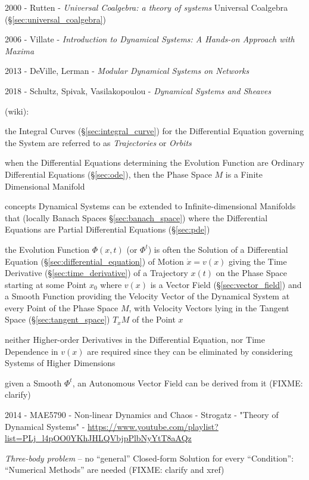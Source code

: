 2000 - Rutten - \emph{Universal Coalgebra: a theory of systems} \cite{rutten00}
\fist Universal Coalgebra (\S\ref{sec:universal_coalgebra})

2006 - Villate - \emph{Introduction to Dynamical Systems: A Hands-on Approach
  with Maxima}

2013 - DeVille, Lerman - \emph{Modular Dynamical Systems on Networks}

2018 - Schultz, Spivak, Vasilakopoulou - \emph{Dynamical Systems and Sheaves}

(wiki):

the Integral Curves (\S\ref{sec:integral_curve}) for the Differential Equation
governing the System are referred to as \emph{Trajectories} or \emph{Orbits}

when the Differential Equations determining the Evolution Function are Ordinary
Differential Equations (\S\ref{sec:ode}), then the Phase Space $M$ is a Finite
Dimensional Manifold

concepts Dynamical Systems can be extended to Infinite-dimensional Manifolds
that (locally Banach Spaces \S\ref{sec:banach_space}) where the Differential
Equations are Partial Differential Equations (\S\ref{sec:pde})

the Evolution Function $\Phi(x,t)$ (or $\Phi^t$) is often the Solution of a
Differential Equation (\S\ref{sec:differential_equation}) of Motion $\dot{x} =
v(x)$ giving the Time Derivative (\S\ref{sec:time_derivative}) of a Trajectory
$x(t)$ on the Phase Space starting at some Point $x_0$ where $v(x)$ is a Vector
Field (\S\ref{sec:vector_field}) and a Smooth Function providing the Velocity
Vector of the Dynamical System at every Point of the Phase Space $M$, with
Velocity Vectors lying in the Tangent Space (\S\ref{sec:tangent_space}) $T_xM$
of the Point $x$

neither Higher-order Derivatives in the Differential Equation, nor Time
Dependence in $v(x)$ are required since they can be eliminated by considering
Systems of Higher Dimensions

given a Smooth $\Phi^t$, an Autonomous Vector Field can be derived from it
(FIXME: clarify)

\asterism

2014 - MAE5790 - Non-linear Dynamics and Chaos - Strogatz - "Theory of
Dynamical Systems" -
\url{https://www.youtube.com/playlist?list=PLj_l4pOO0YKhJHLQVbjpPlbNyYtT8aAQz}

\emph{Three-body problem} -- no ``general'' Closed-form Solution for every
``Condition'': ``Numerical Methods'' are needed
(FIXME: clarify and xref)

